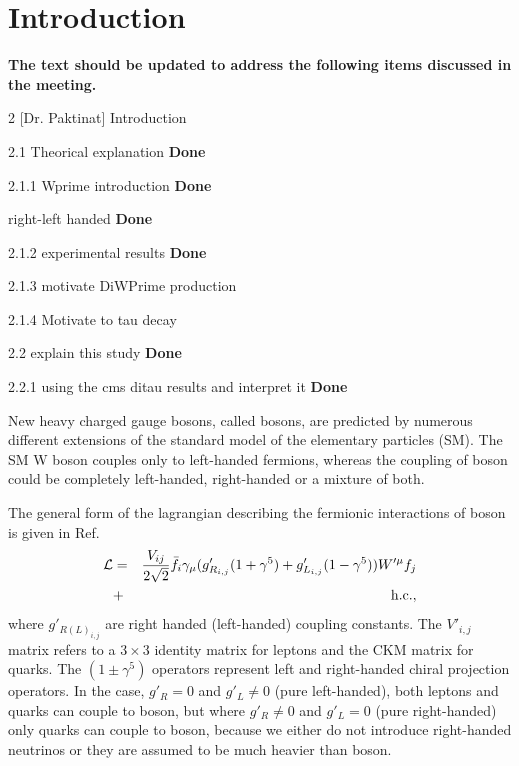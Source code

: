 \section{Introduction}\label{sec:int} 


{\bf The text should be updated to address the following items discussed in the meeting.}

2 [Dr. Paktinat] Introduction 

2.1 Theorical explanation {\bf Done}

2.1.1 Wprime introduction {\bf Done}

right-left handed {\bf Done}

2.1.2 experimental results {\bf Done}

2.1.3 motivate DiWPrime production

2.1.4 Motivate to tau decay

2.2 explain this study {\bf Done}

2.2.1 using the cms ditau results and interpret it {\bf Done}




New heavy charged gauge bosons, called \wprime bosons, are predicted by numerous different extensions of the standard model of the elementary particles (SM). 
The SM W boson couples only to left-handed fermions, whereas the coupling of \wprime boson could be completely left-handed, right-handed or a mixture of both. 

The general form of the lagrangian describing the fermionic interactions of \wprime boson is given in  Ref.~\cite{Sullivan:2002jt}
\begin{eqnarray}
{\cal L}& =& \frac{V_{ij}}{2\sqrt{2}}\bar{f_i} \gamma_{\mu}(g^\prime_{R_{i,j}} (1+{\gamma}^5)+
g^\prime_{L_{i,j}}
(1-{\gamma}^5)) W^{\prime \mu} f_j  \nonumber\\
&+& \mathrm{h.c.},
\end{eqnarray}
where $g'_{R(L)_{i,j}}$ are right handed (left-handed) coupling constants. The $V'_{i,j}$ matrix refers to a $3\times3$ identity matrix for leptons and the CKM matrix for quarks. The $(1\pm{\gamma^5})$ operators represent left and right-handed chiral projection operators. In the case, $g'_R = 0$ and $g'_L \neq 0$ (pure left-handed), both leptons and quarks can couple to \wprime boson, but where $g'_R \neq 0$ and $g'_L = 0$ (pure right-handed) only quarks can couple to \wprime boson, because we either do not introduce right-handed neutrinos or they are assumed to be much heavier than \wprime boson. 


